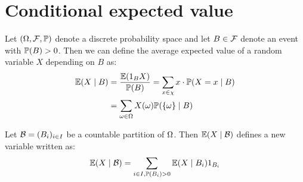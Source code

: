 \section{Conditional expected value}
\begin{ddefinition*}
  Let \((\O, \F, \P)\) denote a discrete probability space and let \(B \in \F\) denote an event with \(\P(B) > 0\). Then we can define the average expected value of a random variable \(X\) depending on \(B\) as:
  \begin{align*}
    \E(X \mid B) &= \frac{\E(\I_B X)}{\P(B)} = \sum_{x \in \chi} x \cdot \P(X = x \mid B) \\
    &= \sum_{\omega \in \O} X(\omega) \P(\{\omega\} \mid B)
  \end{align*}
\end{ddefinition*}

\begin{ddefinition*}
  Let \(\B = (B_i)_{i \in I}\) be a countable partition of \(\O\). Then \(\E(X \mid \B)\) defines a new variable written as:
  \[\E(X \mid \B) = \sum_{i \in I, \P(B_i) > 0} \E(X \mid B_i) \I_{B_i}\]
\end{ddefinition*}